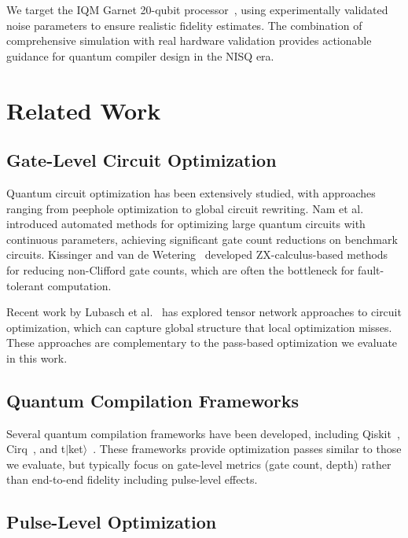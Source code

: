 \documentclass[journal]{IEEEtran}
\begin{document}
We target the IQM Garnet 20-qubit processor~\cite{iqm2024garnet}, using experimentally validated noise parameters to ensure realistic fidelity estimates. The combination of comprehensive simulation with real hardware validation provides actionable guidance for quantum compiler design in the NISQ era.

\section{Related Work}
\label{sec:related}

\subsection{Gate-Level Circuit Optimization}

Quantum circuit optimization has been extensively studied, with approaches ranging from peephole optimization to global circuit rewriting. Nam et al.~\cite{nam2018automated} introduced automated methods for optimizing large quantum circuits with continuous parameters, achieving significant gate count reductions on benchmark circuits. Kissinger and van de Wetering~\cite{kissinger2020reducing} developed ZX-calculus-based methods for reducing non-Clifford gate counts, which are often the bottleneck for fault-tolerant computation.

Recent work by Lubasch et al.~\cite{lubasch2025tensor} has explored tensor network approaches to circuit optimization, which can capture global structure that local optimization misses. These approaches are complementary to the pass-based optimization we evaluate in this work.

\subsection{Quantum Compilation Frameworks}

Several quantum compilation frameworks have been developed, including Qiskit~\cite{qiskit2024}, Cirq~\cite{cirq2024}, and t$|$ket$\rangle$~\cite{tket2020}. These frameworks provide optimization passes similar to those we evaluate, but typically focus on gate-level metrics (gate count, depth) rather than end-to-end fidelity including pulse-level effects.

\subsection{Pulse-Level Optimization}
\end{document}
